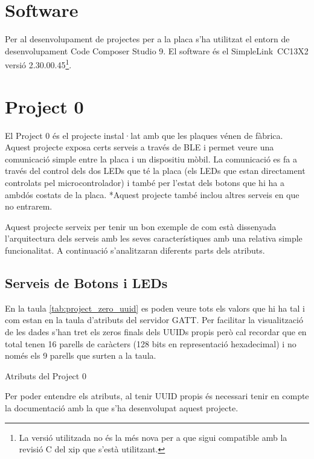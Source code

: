 \section{Software}
Per al desenvolupament de projectes per a la placa s'ha utilitzat el entorn de desenvolupament Code Composer Studio 9. El software és el SimpleLink\texttrademark\ CC13X2 versió 2.30.00.45\footnote{La versió utilitzada no és la més nova per a que sigui compatible amb la revisió C del xip que s'està utilitzant.}.

\section{Project 0}
El Project 0 és el projecte instal·lat amb que les plaques vénen de fàbrica. Aquest projecte exposa certs serveis a través de BLE i permet veure una comunicació simple entre la placa i un dispositiu mòbil.
La comunicació es fa a través del control dels dos LEDs que té la placa (els LEDs que estan directament controlats pel microcontrolador) i també per l'estat dels botons que hi ha a ambdós costats de la placa.
*Aquest projecte també inclou altres serveis en que no entrarem.

Aquest projecte serveix per tenir un bon exemple de com està dissenyada l'arquitectura dels serveis amb les seves característiques amb una relativa simple funcionalitat. A continuació s'analitzaran diferents parts dels atributs.

\subsection{Serveis de Botons i LEDs}

En la taula \ref{tab:project_zero_uuid} es poden veure tots els valors que hi ha tal i com estan en la taula d'atributs del servidor GATT.
Per facilitar la visualització de les dades s'han tret els zeros finals dels UUIDs propis però cal recordar que en total tenen 16 parells de caràcters (128 bits en representació hexadecimal) i no només els 9 parells que surten a la taula.
\begin{center}
	\begin{table}[h!]
		\caption{Atributs del Project 0}
	\end{table}
	\label{tab:project_zero_uuid}
\end{center}
Per poder entendre els atributs, al tenir UUID propis és necessari tenir en compte la documentació amb la que s'ha desenvolupat aquest projecte.

